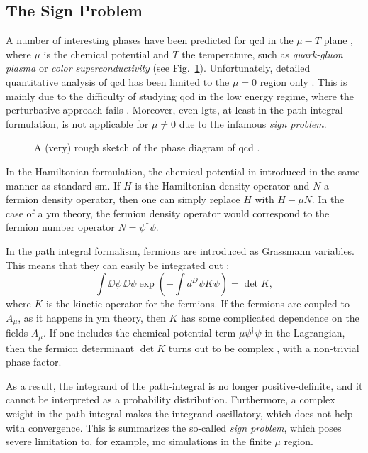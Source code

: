 \subsection{The Sign Problem}
\label{sub:the_sign_problem}

A number of interesting phases have been predicted for \ac{qcd} in the $\mu - T$ plane \cite{aarts2016qcd}, where $\mu$ is the chemical potential and $T$ the temperature, such as \emph{quark-gluon plasma} \cite{detar2009qcdthermo} or \emph{color superconductivity} \cite{alford2001coloursc} (see Fig.~\ref{fig:qcd_phase_diagram}).
Unfortunately, detailed quantitative analysis of \ac{qcd} has been limited to the $\mu = 0$ region only \cite{aarts2016qcd}.
This is mainly due to the difficulty of studying \ac{qcd} in the low energy regime, where the perturbative approach fails \cite{peskin1995qft, creutz1985book}.
Moreover, even \ac{lgt}s, at least in the path-integral formulation, is not applicable for $\mu \neq 0$ due to the infamous \emph{sign problem}.


\begin{figure}[t]
    \centering
    
    \caption{A (very) rough sketch of the phase diagram of \ac{qcd} \cite{aarts2016qcd}.}
    \label{fig:qcd_phase_diagram}
\end{figure}


In the Hamiltonian formulation, the chemical potential in introduced in the same manner as standard \ac{sm}.
If $H$ is the Hamiltonian density operator and $N$ a fermion density operator, then one can simply replace $H$ with $H - \mu N$.
In the case of a \ac{ym} theory, the fermion density operator would correspond to the fermion number operator $N = \psi^{\dagger} \psi$.

In the path integral formalism, fermions are introduced as Grassmann variables.
This means that they can easily be integrated out \cite{peskin1995qft, aarts2016qcd}:
\begin{equation}
    \int \DD \overline{\psi}\, \DD \psi \exp(-\int d^{D} \overline{\psi} K \psi) = \det K,
\end{equation}
where $K$ is the kinetic operator for the fermions.
If the fermions are coupled to $A_{\mu}$, as it happens in \ac{ym} theory, then $K$ has some complicated dependence on the fields $A_{\mu}$.
If one includes the chemical potential term $\mu \psi^{\dagger} \psi$ in the Lagrangian, then the fermion determinant $\det K$ turns out to be complex \cite{aarts2016qcd}, with a non-trivial phase factor.

As a result, the integrand of the path-integral is no longer positive-definite, and it cannot be interpreted as a probability distribution.
Furthermore, a complex weight in the path-integral makes the integrand oscillatory, which does not help with convergence.
This is summarizes the so-called \emph{sign problem}, which poses severe limitation to, for example, \ac{mc} simulations in the finite $\mu$ region.

